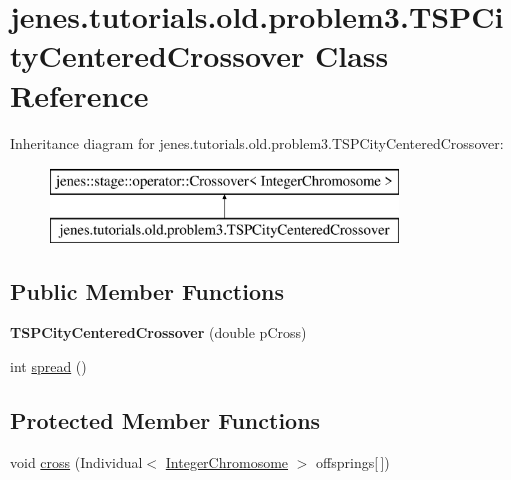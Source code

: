 \hypertarget{classjenes_1_1tutorials_1_1old_1_1problem3_1_1_t_s_p_city_centered_crossover}{\section{jenes.\-tutorials.\-old.\-problem3.\-T\-S\-P\-City\-Centered\-Crossover Class Reference}
\label{classjenes_1_1tutorials_1_1old_1_1problem3_1_1_t_s_p_city_centered_crossover}
}
Inheritance diagram for jenes.\-tutorials.\-old.\-problem3.\-T\-S\-P\-City\-Centered\-Crossover\-:\begin{figure}[H]
\begin{center}
\leavevmode
\includegraphics[height=2.000000cm]{classjenes_1_1tutorials_1_1old_1_1problem3_1_1_t_s_p_city_centered_crossover}
\end{center}
\end{figure}
\subsection*{Public Member Functions}
\begin{DoxyCompactItemize}
\item 
\hypertarget{classjenes_1_1tutorials_1_1old_1_1problem3_1_1_t_s_p_city_centered_crossover_a1d89f8d326252c8c65c7abc11e486722}{{\bfseries T\-S\-P\-City\-Centered\-Crossover} (double p\-Cross)}\label{classjenes_1_1tutorials_1_1old_1_1problem3_1_1_t_s_p_city_centered_crossover_a1d89f8d326252c8c65c7abc11e486722}

\item 
int \hyperlink{classjenes_1_1tutorials_1_1old_1_1problem3_1_1_t_s_p_city_centered_crossover_a8e53f91513fd450e8852d22fb5afaf17}{spread} ()
\end{DoxyCompactItemize}
\subsection*{Protected Member Functions}
\begin{DoxyCompactItemize}
\item 
void \hyperlink{classjenes_1_1tutorials_1_1old_1_1problem3_1_1_t_s_p_city_centered_crossover_ad953284beb1ccab1a3eb78c37096a3fa}{cross} (Individual$<$ \hyperlink{classjenes_1_1chromosome_1_1_integer_chromosome}{Integer\-Chromosome} $>$ offsprings\mbox{[}$\,$\mbox{]})
\end{DoxyCompactItemize}


